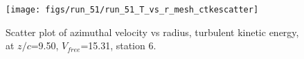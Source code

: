 \begin{figure}[H]
\centering
\texttt{[image: figs/run\_51/run\_51\_T\_vs\_r\_mesh\_ctkescatter]}
\caption{Scatter plot of azimuthal velocity vs radius, turbulent kinetic energy, at $z/c$=9.50, $V_{free}$=15.31, station 6.}
\end{figure}


